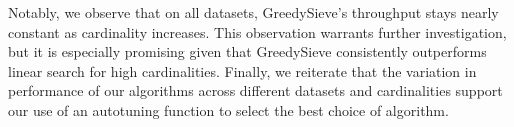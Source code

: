 Notably, we observe that on all datasets, GreedySieve's throughput stays nearly constant as cardinality increases. This observation warrants further investigation, but it is especially promising given that GreedySieve consistently outperforms linear search for high cardinalities. 
Finally, we reiterate that the variation in performance of our algorithms across different datasets and cardinalities support our use of an autotuning function to select the best choice of algorithm. 


